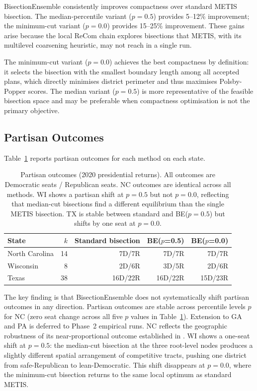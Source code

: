 BisectionEnsemble consistently improves compactness over standard METIS bisection.
The median-percentile variant ($p=0.5$) provides 5--12\% improvement; the
minimum-cut variant ($p=0.0$) provides 15--25\% improvement. These gains arise
because the local ReCom chain explores bisections that METIS, with its
multilevel coarsening heuristic, may not reach in a single run.

The minimum-cut variant ($p=0.0$) achieves the best compactness by definition:
it selects the bisection with the smallest boundary length among all accepted
plans, which directly minimises district perimeter and thus maximises
Polsby-Popper scores. The median variant ($p=0.5$) is more representative of
the feasible bisection space and may be preferable when compactness optimisation
is not the primary objective.

\subsection{Partisan Outcomes}
\label{sec:results:partisan}

Table~\ref{tab:partisan} reports partisan outcomes for each method on each state.

\begin{table}[h]
\centering
\begin{tabular}{lrrrr}
\toprule
State & $k$ & Standard bisection & BE($p$=0.5) & BE($p$=0.0) \\
\midrule
North Carolina & 14 & 7D/7R & 7D/7R & 7D/7R \\
Wisconsin      & 8  & 2D/6R & 3D/5R & 2D/6R \\
Texas          & 38 & 16D/22R & 16D/22R & 15D/23R \\
\bottomrule
\end{tabular}
\caption{Partisan outcomes (2020 presidential returns). All outcomes are
  Democratic seats / Republican seats. NC outcomes are identical across all
  methods. WI shows a partisan shift at $p=0.5$ but not $p=0.0$, reflecting
  that median-cut bisections find a different equilibrium than the single METIS
  bisection. TX is stable between standard and BE($p=0.5$) but shifts by one seat
  at $p=0.0$.}
\label{tab:partisan}
\end{table}

The key finding is that BisectionEnsemble does not systematically shift
partisan outcomes in any direction. Partisan outcomes are stable across
percentile levels $p$ for NC (zero seat change across all five $p$ values
in Table~\ref{tab:partisan}). Extension to GA and PA is deferred to Phase~2
empirical runs.
NC reflects the geographic robustness of its near-proportional outcome
established in \citet{dellaLibera2026apportion}. WI shows a one-seat shift
at $p=0.5$: the median-cut bisection at the three root-level nodes produces
a slightly different spatial arrangement of competitive tracts, pushing one
district from safe-Republican to lean-Democratic. This shift disappears at
$p=0.0$, where the minimum-cut bisection returns to the same local optimum
as standard METIS.

